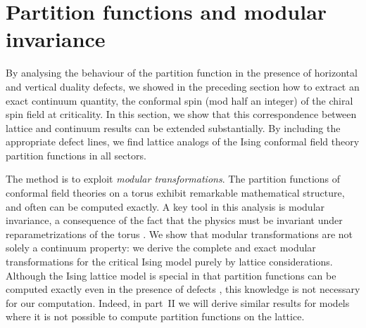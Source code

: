 \documentclass[11pt]{article}
\numberwithin{equation}{section}		%
\begin{document}

\section{Partition functions and modular invariance} 
\label{sec:partition}

By analysing the behaviour of the partition function in the presence of horizontal and vertical duality defects, we showed in the preceding section how to extract an exact continuum quantity, the conformal spin (mod half an integer) of the chiral spin field at criticality. In this section, we show that this correspondence between lattice and continuum results can be extended substantially. By including the appropriate defect lines, we find lattice analogs of the Ising conformal field theory partition functions in all sectors. 

The method is to exploit {\em modular transformations}. The partition functions of conformal field theories on a torus exhibit remarkable mathematical structure, and often can be computed exactly. A key tool in this analysis is modular invariance, a consequence of the fact that the physics must be invariant under reparametrizations of the torus \cite{Cardy1986}. 
We show that modular transformations are not solely a continuum property: we derive the complete and exact modular transformations for the critical Ising model purely by lattice considerations. Although the Ising lattice model is special in that partition functions can be computed exactly even in the presence of defects \cite{Grimm2003}, this knowledge is not necessary for our computation. Indeed, in part~II we will derive similar results for models where it is not possible to compute partition functions on the lattice. 
\end{document}
